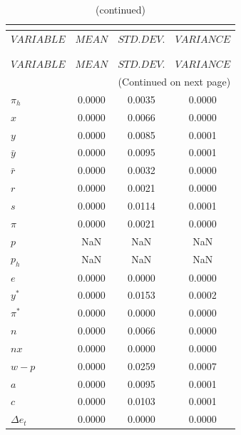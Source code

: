  
\begin{center}
\begin{longtable}{lccc} 
\caption{THEORETICAL MOMENTS}\\
 \label{Table:th_moments}\\
\toprule 
$VARIABLE    $	 & 	 $         MEAN$	 & 	 $    STD. DEV.$	 & 	 $     VARIANCE$\\
\midrule \endfirsthead 
\caption{(continued)}\\
 \toprule \\ 
$VARIABLE    $	 & 	 $         MEAN$	 & 	 $    STD. DEV.$	 & 	 $     VARIANCE$\\
\midrule \endhead 
\midrule \multicolumn{4}{r}{(Continued on next page)} \\ \bottomrule \endfoot 
\bottomrule \endlastfoot 
${\pi_h}     $	 & 	       0.0000	 & 	       0.0035	 & 	       0.0000 \\ 
$x           $	 & 	       0.0000	 & 	       0.0066	 & 	       0.0000 \\ 
$y           $	 & 	       0.0000	 & 	       0.0085	 & 	       0.0001 \\ 
${\bar y}    $	 & 	       0.0000	 & 	       0.0095	 & 	       0.0001 \\ 
${\bar r}    $	 & 	       0.0000	 & 	       0.0032	 & 	       0.0000 \\ 
$r           $	 & 	       0.0000	 & 	       0.0021	 & 	       0.0000 \\ 
$s           $	 & 	       0.0000	 & 	       0.0114	 & 	       0.0001 \\ 
${\pi}       $	 & 	       0.0000	 & 	       0.0021	 & 	       0.0000 \\ 
$p           $	 & 	          NaN	 & 	          NaN	 & 	          NaN \\ 
${p_h}       $	 & 	          NaN	 & 	          NaN	 & 	          NaN \\ 
$e           $	 & 	       0.0000	 & 	       0.0000	 & 	       0.0000 \\ 
${y^*}       $	 & 	       0.0000	 & 	       0.0153	 & 	       0.0002 \\ 
${\pi^{*}}   $	 & 	       0.0000	 & 	       0.0000	 & 	       0.0000 \\ 
${n}         $	 & 	       0.0000	 & 	       0.0066	 & 	       0.0000 \\ 
${nx}        $	 & 	       0.0000	 & 	       0.0000	 & 	       0.0000 \\ 
${w-p}       $	 & 	       0.0000	 & 	       0.0259	 & 	       0.0007 \\ 
$a           $	 & 	       0.0000	 & 	       0.0095	 & 	       0.0001 \\ 
$c           $	 & 	       0.0000	 & 	       0.0103	 & 	       0.0001 \\ 
$\Delta e_t  $	 & 	       0.0000	 & 	       0.0000	 & 	       0.0000 \\ 
\end{longtable}
 \end{center}
